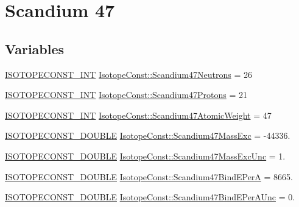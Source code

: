 \hypertarget{group___isotope_const-_scandium-_sc47}{}\section{Scandium 47}
\label{group___isotope_const-_scandium-_sc47}
\subsection*{Variables}
\begin{DoxyCompactItemize}
\item 
\mbox{\hyperlink{group___isotope_const-_macros_ga5f18360b3e99483a35c32d789e62621c}{I\+S\+O\+T\+O\+P\+E\+C\+O\+N\+S\+T\+\_\+\+I\+NT}} \mbox{\hyperlink{group___isotope_const-_scandium-_sc47_gabe38922c10d57d21c211a29b8297eb24}{Isotope\+Const\+::\+Scandium47\+Neutrons}} = 26
\item 
\mbox{\hyperlink{group___isotope_const-_macros_ga5f18360b3e99483a35c32d789e62621c}{I\+S\+O\+T\+O\+P\+E\+C\+O\+N\+S\+T\+\_\+\+I\+NT}} \mbox{\hyperlink{group___isotope_const-_scandium-_sc47_gafb0a783ecab2e200f73aa9cd0259e9e2}{Isotope\+Const\+::\+Scandium47\+Protons}} = 21
\item 
\mbox{\hyperlink{group___isotope_const-_macros_ga5f18360b3e99483a35c32d789e62621c}{I\+S\+O\+T\+O\+P\+E\+C\+O\+N\+S\+T\+\_\+\+I\+NT}} \mbox{\hyperlink{group___isotope_const-_scandium-_sc47_gad0e54ed05cf04098eacd859eb5cb5f83}{Isotope\+Const\+::\+Scandium47\+Atomic\+Weight}} = 47
\item 
\mbox{\hyperlink{group___isotope_const-_macros_ga8f45a7272ce02c0b4c65c44636ed719a}{I\+S\+O\+T\+O\+P\+E\+C\+O\+N\+S\+T\+\_\+\+D\+O\+U\+B\+LE}} \mbox{\hyperlink{group___isotope_const-_scandium-_sc47_ga35459b63684892d5ace3282a31ef859e}{Isotope\+Const\+::\+Scandium47\+Mass\+Exc}} = -\/44336.
\item 
\mbox{\hyperlink{group___isotope_const-_macros_ga8f45a7272ce02c0b4c65c44636ed719a}{I\+S\+O\+T\+O\+P\+E\+C\+O\+N\+S\+T\+\_\+\+D\+O\+U\+B\+LE}} \mbox{\hyperlink{group___isotope_const-_scandium-_sc47_ga61178bf61ffbdbfd623c88a3d3ca0f84}{Isotope\+Const\+::\+Scandium47\+Mass\+Exc\+Unc}} = 1.
\item 
\mbox{\hyperlink{group___isotope_const-_macros_ga8f45a7272ce02c0b4c65c44636ed719a}{I\+S\+O\+T\+O\+P\+E\+C\+O\+N\+S\+T\+\_\+\+D\+O\+U\+B\+LE}} \mbox{\hyperlink{group___isotope_const-_scandium-_sc47_gac9a0e413db4e2ebc5167ad5da2173764}{Isotope\+Const\+::\+Scandium47\+Bind\+E\+PerA}} = 8665.
\item 
\mbox{\hyperlink{group___isotope_const-_macros_ga8f45a7272ce02c0b4c65c44636ed719a}{I\+S\+O\+T\+O\+P\+E\+C\+O\+N\+S\+T\+\_\+\+D\+O\+U\+B\+LE}} \mbox{\hyperlink{group___isotope_const-_scandium-_sc47_gac27ac534257f1c72fef3ece7a3803513}{Isotope\+Const\+::\+Scandium47\+Bind\+E\+Per\+A\+Unc}} = 0.

\end{DoxyCompactItemize}
